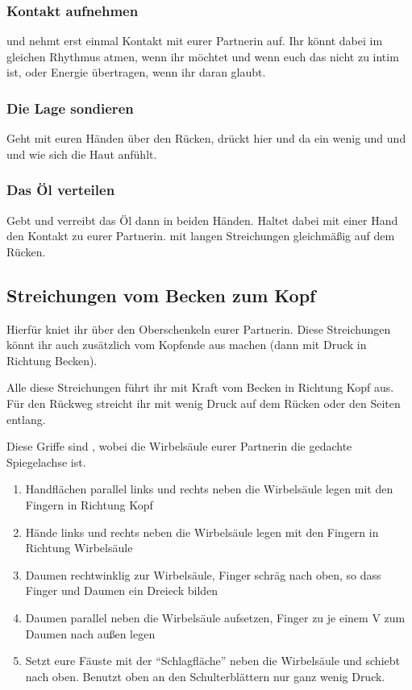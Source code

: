\subsubsection{Kontakt aufnehmen}
 und nehmt erst einmal Kontakt mit eurer Partnerin auf. Ihr könnt dabei im gleichen Rhythmus atmen, wenn ihr möchtet und wenn euch das nicht zu intim ist, oder Energie übertragen, wenn ihr daran glaubt.

\subsubsection{Die Lage sondieren}
Geht mit euren Händen über den Rücken, drückt hier und da ein wenig und und  und wie sich die Haut anfühlt.

\subsubsection{Das Öl verteilen}

Gebt  und verreibt das Öl dann in beiden Händen. Haltet dabei mit einer Hand den Kontakt zu eurer Partnerin.  mit langen Streichungen gleichmäßig auf dem Rücken.


\subsection{Streichungen vom Becken zum Kopf}
Hierfür kniet ihr über den Oberschenkeln eurer Partnerin. Diese Streichungen könnt ihr auch zusätzlich vom Kopfende aus machen (dann mit Druck in Richtung Becken).

Alle diese Streichungen führt ihr mit Kraft vom Becken in Richtung Kopf aus. Für den Rückweg streicht ihr mit wenig Druck auf dem Rücken oder den Seiten entlang.

Diese Griffe sind , wobei die Wirbelsäule eurer Partnerin die gedachte Spiegelachse ist.

\begin{enumerate}
	\item {} Handflächen parallel links und rechts neben die Wirbelsäule legen mit den Fingern in Richtung Kopf
	\item {} Hände links und rechts neben die Wirbelsäule legen mit den Fingern in Richtung Wirbelsäule
	\item {} Daumen rechtwinklig zur Wirbelsäule, Finger schräg nach oben, so dass Finger und Daumen ein Dreieck bilden
	\item {} Daumen parallel neben die Wirbelsäule aufsetzen, Finger zu je einem V zum Daumen nach außen legen
	\item {} Setzt eure Fäuste mit der ``Schlagfläche'' neben die Wirbelsäule und schiebt nach oben. Benutzt oben an den Schulterblättern nur ganz wenig Druck.
\end{enumerate}


